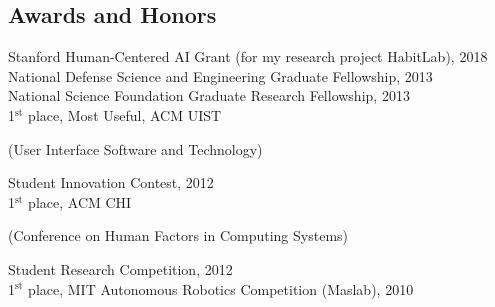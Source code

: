 \documentclass[margin,line]{resume}
\begin{document}
\begin{resume}



\section{\mysidestyle Awards and Honors}

Stanford Human-Centered AI Grant (for my research project HabitLab), 2018\\ %
National Defense Science and Engineering Graduate Fellowship, 2013\\ %
National Science Foundation Graduate Research Fellowship, 2013\\ %
1$^{\textrm{st}}$ place, Most Useful, ACM UIST \begin{small}(User Interface Software and Technology)\end{small} Student Innovation Contest, 2012\\
1$^{\textrm{st}}$ place, ACM CHI \begin{small}(Conference on Human Factors in Computing Systems)\end{small} Student Research Competition, 2012\\
1$^{\textrm{st}}$ place, MIT Autonomous Robotics Competition (Maslab), 2010

\pagebreak





\end{resume}
\end{document}
